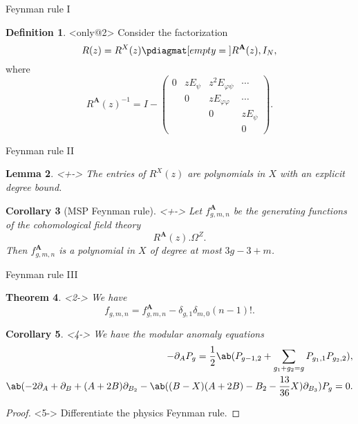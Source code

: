 \documentclass[10pt]{beamer}
\newcommand{\bA}{\mathbf{A}}
\newcommand{\1}{\mathbf{1}}
\newcommand{\2}{\mathbf{2}}
\newcommand{\3}{\mathbf{3}}
\newtheorem{thm}{Theorem}[section]
\newtheorem{cor}[thm]{Corollary}
\newtheorem{lem}[thm]{Lemma}
\theoremstyle{definition}
\newtheorem{defn}[thm]{Definition}
\theoremstyle{remark}
\theoremstyle{plain}
\theoremstyle{definition}
\theoremstyle{remark}
\begin{document}
\begin{frame}{Feynman rule I}

  \begin{defn}<only@2>
    Consider the factorization
    \[ R(z) = R^X(z)\pdiagmat[empty={}]{R^{\bA}(z), I_N},\]
    where
    \[ R^{\bA}(z)^{-1} = I - \begin{pmatrix}
      0 & z E_{\psi} & z^2 E_{\varphi\psi} & \cdots \\
      & 0 & z E_{\varphi\varphi} & \cdots \\
      & & 0 & z E_{\psi} \\
      & & & 0
    \end{pmatrix}. \]
  \end{defn}
\end{frame}

\begin{frame}{Feynman rule II}
  \begin{lem}<+->
    The entries of $R^X(z)$ are polynomials in $X$ with an explicit degree bound.
  \end{lem}
  \begin{cor}[MSP Feynman rule]<+->
    Let $f_{g,m,n}^{\bA}$ be the generating functions of the cohomological field theory
    \[ R^{\bA}(z).\Omega^Z. \]
    Then $f_{g,m,n}^{\bA}$ is a polynomial in $X$ of degree at most $3g-3+m$.
  \end{cor}
\end{frame}

\begin{frame}{Feynman rule III}
  \begin{thm}<2->
    We have
    \[ f_{g,m,n} = f_{g,m,n}^{\bA} - \delta_{g,1} \delta_{m,0} (n-1)!. \]
  \end{thm}
  \begin{cor}<4->
    We have the \textit{modular anomaly equations}
    \footnotesize
    \begin{align*}
      - \partial_{A} P_g = \frac{1}{2} \ab(P_{g-1,2} + \sum_{g_1+g_2 = g} P_{g_1, 1} P_{g_2, 2}),  \\
      \ab(-2 \partial_{A} + \partial_{B} + (A+2B) \partial_{B_2} - \ab((B-X)(A+2B)-B_2-\frac{13}{36} X)\partial_{B_3})P_g = 0.
    \end{align*}
  \end{cor}
  \begin{proof}<5->
    Differentiate the physics Feynman rule.
  \end{proof}
\end{frame}
\end{document}
